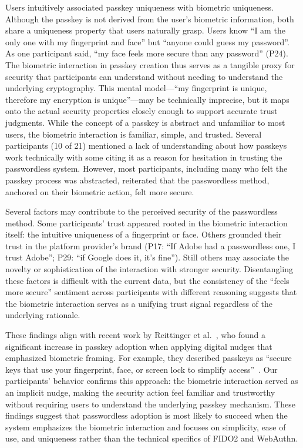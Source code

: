 Users intuitively associated passkey uniqueness with biometric uniqueness. Although the passkey is not derived from the user's biometric information, both share a uniqueness property that users naturally grasp. Users know ``I am the only one with my fingerprint and face'' but ``anyone could guess my password''. As one participant said, ``my face feels more secure than any password'' (P24). The biometric interaction in passkey creation thus serves as a tangible proxy for security that participants can understand without needing to understand the underlying cryptography. This mental model---``my fingerprint is unique, therefore my encryption is unique''---may be technically imprecise, but it maps onto the actual security properties closely enough to support accurate trust judgments. While the concept of a passkey is abstract and unfamiliar to most users, the biometric interaction is familiar, simple, and trusted. Several participants (10 of 21) mentioned a lack of understanding about how passkeys work technically with some citing it as a reason for hesitation in trusting the passwordless system. However, most participants, including many who felt the passkey process was abstracted, reiterated that the passwordless method, anchored on their biometric action, felt more secure.

Several factors may contribute to the perceived security of the passwordless method. Some participants' trust appeared rooted in the biometric interaction itself: the intuitive uniqueness of a fingerprint or face. Others grounded their trust in the platform provider's brand (P17: ``If Adobe had a passwordless one, I trust Adobe''; P29: ``if Google does it, it's fine''). Still others may associate the novelty or sophistication of the interaction with stronger security. Disentangling these factors is difficult with the current data, but the consistency of the ``feels more secure'' sentiment across participants with different reasoning suggests that the biometric interaction serves as a unifying trust signal regardless of the underlying rationale.

These findings align with recent work by Reittinger et al.~\cite{reittinger_passkey_2026}, who found a significant increase in passkey adoption when applying digital nudges that emphasized biometric framing. For example, they described passkeys as ``secure keys that use your fingerprint, face, or screen lock to simplify access''~\cite{reittinger_passkey_2026}. Our participants' behavior confirms this approach: the biometric interaction served as an implicit nudge, making the security action feel familiar and trustworthy without requiring users to understand the underlying passkey mechanism. These findings suggest that passwordless adoption is most likely to succeed when the system emphasizes the biometric interaction and focuses on simplicity, ease of use, and uniqueness rather than the technical specifics of FIDO2 and WebAuthn.

